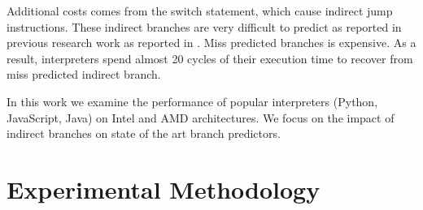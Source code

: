 \documentclass[parskip=full, paper=a4, fontsize=12pt]{scrartcl} %
\numberwithin{equation}{section}
\numberwithin{figure}{section}
\numberwithin{table}{section}
\begin{document}
Additional costs comes from the switch statement, which cause indirect
jump instructions. These indirect branches are very difficult to
predict as reported in previous research work as reported in
{\color{red}{citation paper 3}}. Miss predicted branches is expensive.
As a result, interpreters spend almost 20 cycles of their execution
time to recover from miss predicted indirect branch.

In this work we examine the performance of popular interpreters
(Python, JavaScript, Java) on Intel and AMD architectures. We focus on
the impact of indirect branches on state of the art branch predictors.

\section{Experimental Methodology}
\end{document}
